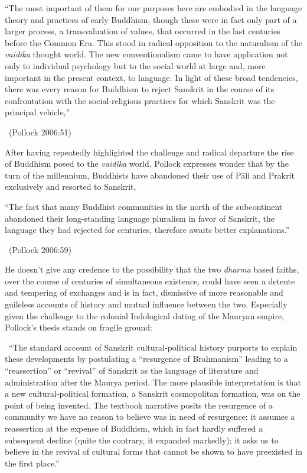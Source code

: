 \begin{myquote}
“The most important of them for our purposes here are embodied in the language theory and practices of early Buddhism, though these were in fact only part of a larger process, a transvaluation of values, that occurred in the last centuries before the Common Era. This stood in radical opposition to the naturalism of the \textit{vaidika} thought world. The new conventionalism came to have application not only to individual psychology but to the social world at large and, more important in the present context, to language. In light of these broad tendencies, there was every reason for Buddhism to reject Sanskrit in the course of its confrontation with the social-religious practices for which Sanskrit was the principal vehicle,” 

~\hfill (Pollock 2006:51)
\end{myquote}

After having repeatedly highlighted the challenge and radical departure the rise of Buddhism posed to the \textit{vaidika} world, Pollock expresses wonder that by the turn of the millennium, Buddhists have abandoned their use of Pāli and Prakrit exclusively and resorted to Sanskrit,

\begin{myquote}
“The fact that many Buddhist communities in the north of the subcontinent abandoned their long-standing language pluralism in favor of Sanskrit, the language they had rejected for centuries, therefore awaits better explanations.” 

~\hfill (Pollock 2006:59)
\end{myquote}

He doesn’t give any credence to the possibility that the two \textit{dharma} based faiths, over the course of centuries of simultaneous existence, could have seen a detente and tempering of exchanges and is in fact, dismissive of more reasonable and guileless accounts of history and mutual influence between the two. Especially given the challenge to the colonial Indological dating of the Mauryan empire, Pollock’s thesis stands on fragile ground:

~\hfill “The standard account of Sanskrit cultural-political history purports to explain these developments by postulating a “resurgence of Brahmanism” leading to a “reassertion” or “revival” of Sanskrit as the language of literature and administration after the Maurya period. The more plausible interpretation is that a new cultural-political formation, a Sanskrit cosmopolitan formation, was on the point of being invented. The textbook narrative posits the resurgence of a community we have no reason to believe was in need of resurgence; it assumes a reassertion at the expense of Buddhism, which in fact hardly suffered a subsequent decline (quite the contrary, it expanded markedly); it asks us to believe in the revival of cultural forms that cannot be shown to have preexisted in the first place.” 

